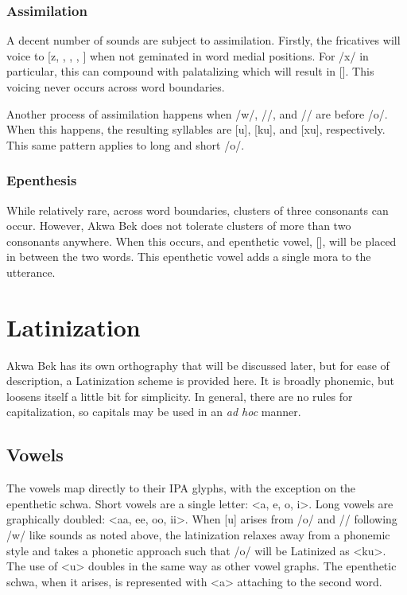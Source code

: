 \documentclass[11pt,letterpaper]{article}
\makeatletter
\newcommand{\tschwa}{\textipa{@}}
\newcommand{\tlongo}{\textipa{o:}}
\newcommand{\tkw}{\textipa{k\super w}}
\newcommand{\txw}{\textipa{x\super w}}
\newcommand{\jj}{\textipa{Z}}
\newcommand{\yoghlig}{\textipa{\textlyoghlig}}
\newcommand{\tgg}{\textipa{G}}
\newcommand{\tggw}{\textipa{\tgg\super w}}
\makeatother
\begin{document}
    \subsubsection{Assimilation}
    \label{assimilation}
    A decent number of sounds are subject to assimilation. Firstly, the fricatives will voice to [z, \jj, \yoghlig, \tgg, \tggw] when not geminated in word medial positions. For /x/ in particular, this can compound with palatalizing which will result in []. This voicing never occurs across word boundaries.
    \par
    Another process of assimilation happens when /w/, /\tkw/, and /\txw/ are before /o/. When this happens, the resulting syllables are [u], [ku], and [xu], respectively. This same pattern applies to long and short /o/.

    \subsubsection{Epenthesis}
    \label{epenthesis}
    While relatively rare, across word boundaries, clusters of three consonants can occur. However, Akwa Bek does not tolerate clusters of more than two consonants anywhere. When this occurs, and epenthetic vowel, [\tschwa], will be placed in between the two words. This epenthetic vowel adds a single mora to the utterance.

\pagebreak


\section{Latinization}
\label{latinization}
Akwa Bek has its own orthography that will be discussed later, but for ease of description, a Latinization scheme is provided here. It is broadly phonemic, but loosens itself a little bit for simplicity. In general, there are no rules for capitalization, so capitals may be used in an \textit{ad hoc} manner.

  \subsection{Vowels}
  The vowels map directly to their IPA glyphs, with the exception on the epenthetic schwa. Short vowels are a single letter: <a, e, o, i>. Long vowels are graphically doubled: <aa, ee, oo, ii>. When [u] arises from /o/ and /\tlongo/ following /w/ like sounds as noted above, the latinization relaxes away from a phonemic style and takes a phonetic approach such that /\tkw o/ will be Latinized as <ku>. The use of <u> doubles in the same way as other vowel graphs. The epenthetic schwa, when it arises, is represented with <a> attaching to the second word.
\end{document}
